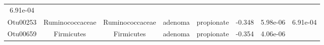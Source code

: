 \documentclass[11pt,]{article}
\begin{document}
\begin{longtable}[]{@{}cccccccc@{}}
\begin{minipage}[t]{0.08\columnwidth}
6.91e-04\strut
\end{minipage}\tabularnewline
\begin{minipage}[t]{0.08\columnwidth}\centering\strut
Otu00253\strut
\end{minipage} & \begin{minipage}[t]{0.15\columnwidth}\centering\strut
Ruminococcaceae\strut
\end{minipage} & \begin{minipage}[t]{0.15\columnwidth}\centering\strut
Ruminococcaceae\strut
\end{minipage} & \begin{minipage}[t]{0.08\columnwidth}\centering\strut
adenoma\strut
\end{minipage} & \begin{minipage}[t]{0.09\columnwidth}\centering\strut
propionate\strut
\end{minipage} & \begin{minipage}[t]{0.07\columnwidth}\centering\strut
-0.348\strut
\end{minipage} & \begin{minipage}[t]{0.08\columnwidth}\centering\strut
5.98e-06\strut
\end{minipage} & \begin{minipage}[t]{0.08\columnwidth}\centering\strut
6.91e-04\strut
\end{minipage}\tabularnewline
\begin{minipage}[t]{0.08\columnwidth}\centering\strut
Otu00659\strut
\end{minipage} & \begin{minipage}[t]{0.15\columnwidth}\centering\strut
Firmicutes\strut
\end{minipage} & \begin{minipage}[t]{0.15\columnwidth}\centering\strut
Firmicutes\strut
\end{minipage} & \begin{minipage}[t]{0.08\columnwidth}\centering\strut
adenoma\strut
\end{minipage} & \begin{minipage}[t]{0.09\columnwidth}\centering\strut
propionate\strut
\end{minipage} & \begin{minipage}[t]{0.07\columnwidth}\centering\strut
-0.354\strut
\end{minipage} & \begin{minipage}[t]{0.08\columnwidth}\centering\strut
4.06e-06\strut
\end{minipage} & \begin{minipage}[t]{0.08\columnwidth}\centering\strut

\end{minipage}
\end{longtable}
\end{document}
